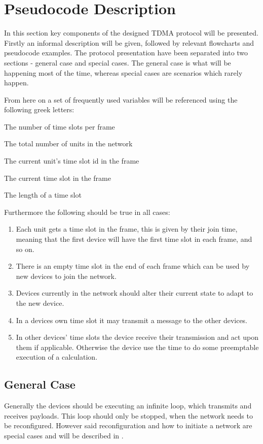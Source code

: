 \section{Pseudocode Description}
In this section key components of the designed TDMA protocol will be presented.
Firstly an informal description will be given, followed by relevant flowcharts and pseudocode examples.
The protocol presentation have been separated into two sections - general case and special cases. 
The general case is what will be happening most of the time, whereas special cases are scenarios which rarely happen. 

From here on a set of frequently used variables will be referenced using the following greek letters: 
\begin{description}[labelindent=\parindent]
    \item[$\alpha$] The number of time slots per frame
    \item[$\beta$] The total number of units in the network
    \item[$\kappa$] The current unit's time slot id in the frame
    \item[$\lambda$] The current time slot in the frame
    \item[$\rho$] The length of a time slot
\end{description}  
\noindent
Furthermore the following should be true in all cases: 
\begin{enumerate}[label=\itshape \alph*\upshape)]
    \item Each unit gets a time slot in the frame, this is given by their join time, meaning that the first device will have the first time slot in each frame, and so on.
    \item There is an empty time slot in the end of each frame which can be used by new devices to join the network.
    \item Devices currently in the network should alter their current state to adapt to the new device.
    \item In a devices own time slot it may transmit a message to the other devices.
    \item In other devices' time slots the device receive their transmission and act upon them if applicable. Otherwise the device use the time to do some preemptable execution of a calculation.
\end{enumerate}
                    
\subsection{General Case} %
\label{sub:general_case}
Generally the devices should be executing an infinite loop, which transmits and receives payloads.
This loop should only be stopped, when the network needs to be reconfigured.
However said reconfiguration and how to initiate a network are special cases and will be described in .

